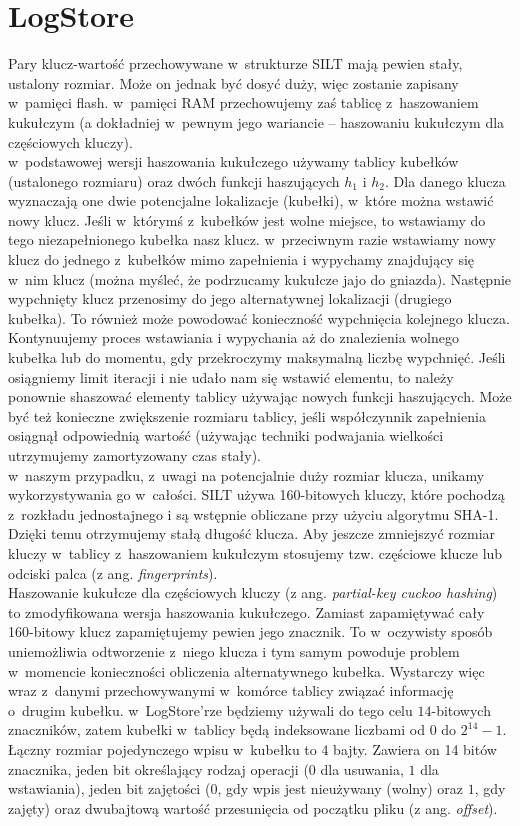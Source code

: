 \documentclass[declaration,shortabstract,masc]{iithesis}
\begin{document}
		\section{LogStore}
			Pary klucz-wartość przechowywane w~strukturze SILT mają pewien stały, ustalony rozmiar. Może on jednak być dosyć duży, więc zostanie zapisany w~pamięci flash. w~pamięci RAM przechowujemy zaś tablicę z~haszowaniem kukułczym (a dokładniej w~pewnym jego wariancie -- haszowaniu kukułczym dla częściowych kluczy).\\
			\indent w~podstawowej wersji haszowania kukułczego używamy tablicy kubełków (ustalonego rozmiaru) oraz dwóch funkcji haszujących $h_1$ i $h_2$. Dla danego klucza wyznaczają one dwie potencjalne lokalizacje (kubełki), w~które można wstawić nowy klucz. Jeśli w~którymś z~kubełków jest wolne miejsce, to wstawiamy do tego niezapełnionego kubełka nasz klucz. w~przeciwnym razie wstawiamy nowy klucz do jednego z~kubełków mimo zapełnienia i wypychamy znajdujący się w~nim klucz (można myśleć, że podrzucamy kukułcze jajo do gniazda). Następnie wypchnięty klucz przenosimy do jego alternatywnej lokalizacji (drugiego kubełka). To również może powodować konieczność wypchnięcia kolejnego klucza. Kontynuujemy proces wstawiania i wypychania aż do znalezienia wolnego kubełka lub do momentu, gdy przekroczymy maksymalną liczbę wypchnięć. Jeśli osiągniemy limit iteracji i nie udało nam się wstawić elementu, to należy ponownie shaszować elementy tablicy używając nowych funkcji haszujących. Może być też konieczne zwiększenie rozmiaru tablicy, jeśli współczynnik zapełnienia osiągnął odpowiednią wartość (używając techniki podwajania wielkości utrzymujemy zamortyzowany czas stały).\\
			\indent w~naszym przypadku, z~uwagi na potencjalnie duży rozmiar klucza, unikamy wykorzystywania go w~całości. SILT używa 160-bitowych kluczy, które pochodzą z~rozkładu jednostajnego i są wstępnie obliczane przy użyciu algorytmu SHA-1. Dzięki temu otrzymujemy stałą długość klucza. Aby jeszcze zmniejszyć rozmiar kluczy w~tablicy z~haszowaniem kukułczym stosujemy tzw. częściowe klucze lub odciski palca (z ang. \textit{fingerprints}).\\
			\indent Haszowanie kukułcze dla częściowych kluczy (z ang. \textit{partial-key cuckoo hashing}) \cite{PKCH} to zmodyfikowana wersja haszowania kukułczego. Zamiast zapamiętywać cały 160-bitowy klucz zapamiętujemy pewien jego znacznik. To w~oczywisty sposób uniemożliwia odtworzenie z~niego klucza i tym samym powoduje problem w~momencie konieczności obliczenia alternatywnego kubełka. Wystarczy więc wraz z~danymi przechowywanymi w~komórce tablicy związać informację o~drugim kubełku. w~LogStore'rze będziemy używali do tego celu $14$-bitowych znaczników, zatem kubełki w~tablicy będą indeksowane liczbami od $0$ do $2^{14} - 1$. Łączny rozmiar pojedynczego wpisu w~kubełku to 4 bajty. Zawiera on 14 bitów znacznika, jeden bit określający rodzaj operacji ($0$ dla usuwania, $1$ dla wstawiania), jeden bit zajętości ($0$, gdy wpis jest nieużywany (wolny) oraz $1$, gdy zajęty) oraz dwubajtową wartość przesunięcia od początku pliku (z ang. \textit{offset}).\\
\end{document}
